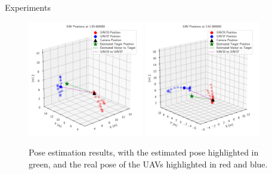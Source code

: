 \documentclass{beamer}
\begin{document}
\begin{frame}{Experiments}

\begin{figure}[H]
	\centering
	  \includegraphics[width=0.45\textwidth]{../fig/pgfplot/build/3dplot2.pdf}
	  \includegraphics[width=0.45\textwidth]{../fig/pgfplot/build/3dplot1.pdf}
	\caption{
           Pose estimation results, with the estimated pose highlighted in green, and the real pose of the UAVs highlighted in red and blue.
        }
	\label{fig:poseresults}
\end{figure}

\end{frame}

\end{document}
